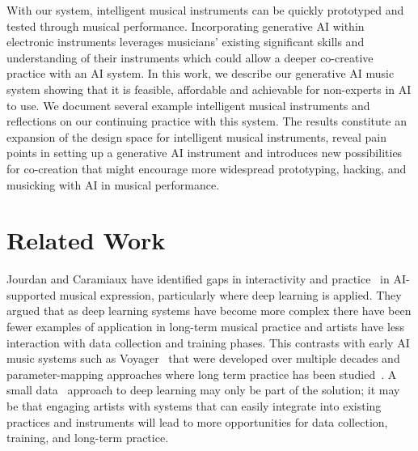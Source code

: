 \documentclass[manuscript,review,anonymous]{acmart}
\begin{document}
With our system, intelligent musical instruments can be quickly prototyped and tested through musical performance.
Incorporating generative AI within electronic instruments leverages musicians' existing significant skills and understanding of their instruments which could allow a deeper co-creative practice with an AI system.
In this work, we describe our generative AI music system showing that it is feasible, affordable and achievable for non-experts in AI to use.
We document several example intelligent musical instruments and reflections on our continuing practice with this system.
The results constitute an expansion of the design space for intelligent musical instruments, reveal pain points in setting up a generative AI instrument and introduces new possibilities for co-creation that might encourage more widespread prototyping, hacking, and musicking with AI in musical performance.

\section{Related Work}\label{related-work}


Jourdan and Caramiaux have identified gaps in interactivity and practice~\cite{jourdan_nime_ml_review} in AI-supported musical expression, particularly where deep learning is applied. 
They argued that as deep learning systems have become more complex there have been fewer examples of application in long-term musical practice and artists have less interaction with data collection and training phases. 
This contrasts with early AI music systems such as Voyager~\cite{Lewis:2000fu} that were developed over multiple decades and  parameter-mapping approaches where long term practice has been studied~\cite{fiebrink_years_ml}.
A small data~\cite{Vigliensoni:2022} approach to deep learning may only be part of the solution; it may be that engaging artists with systems that can easily integrate into existing practices and instruments will lead to more opportunities for data collection, training, and long-term practice.
\end{document}
